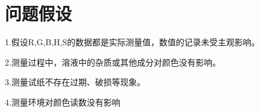 \section{问题假设}
1.假设R,G,B,H,S的数据都是实际测量值，数值的记录未受主观影响。

2.测量过程中，溶液中的杂质或其他成分对颜色没有影响。

3.测量试纸不存在过期、破损等现象。

4.测量环境对颜色读数没有影响
